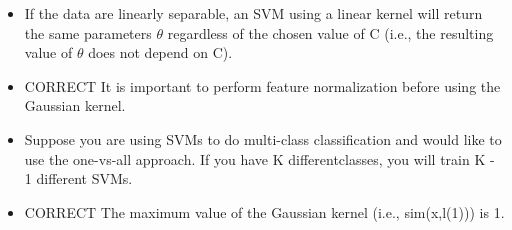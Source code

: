 \documentclass[11pt]{article} %
\begin{document}
\begin{itemize}
	\item If the data are linearly separable, an SVM using a linear kernel will return the same parameters $\theta$ regardless of the chosen value of
	C (i.e., the resulting value of $\theta$ does not depend on C).
	
	\item CORRECT It is important to perform feature normalization before using the Gaussian kernel.
	
	\item Suppose you are using SVMs to do multi-class classification and 	would like to use the one-vs-all approach. If you have K differentclasses, you will train K - 1 different SVMs.
	
	\item CORRECT The maximum value of the Gaussian kernel (i.e., sim(x,l(1))) is 1.
\end{itemize}


\end{document}
